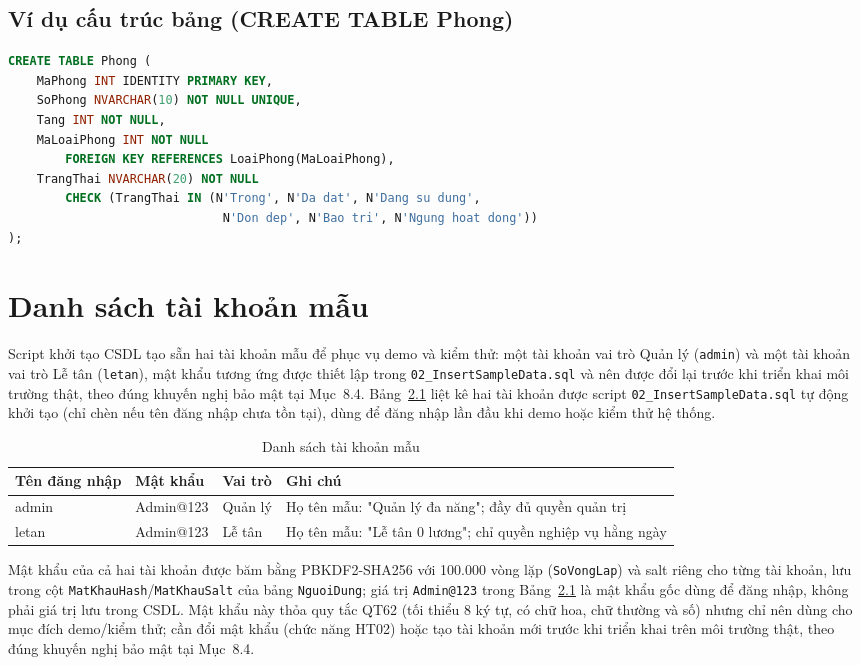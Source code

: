 \documentclass[14pt]{report}
\begin{document}
\section{Ví dụ cấu trúc bảng (CREATE TABLE Phong)}

\begin{lstlisting}[language=SQL, caption={Cấu trúc bảng Phong (rút gọn)}]
CREATE TABLE Phong (
    MaPhong INT IDENTITY PRIMARY KEY,
    SoPhong NVARCHAR(10) NOT NULL UNIQUE,
    Tang INT NOT NULL,
    MaLoaiPhong INT NOT NULL
        FOREIGN KEY REFERENCES LoaiPhong(MaLoaiPhong),
    TrangThai NVARCHAR(20) NOT NULL
        CHECK (TrangThai IN (N'Trong', N'Da dat', N'Dang su dung',
                              N'Don dep', N'Bao tri', N'Ngung hoat dong'))
);
\end{lstlisting}

\chapter{Danh sách tài khoản mẫu}

Script khởi tạo CSDL tạo sẵn hai tài khoản mẫu để phục vụ demo và kiểm thử: một tài khoản vai trò Quản lý (\texttt{admin}) và một tài khoản vai trò Lễ tân (\texttt{letan}), mật khẩu tương ứng được thiết lập trong \texttt{02\_InsertSampleData.sql} và nên được đổi lại trước khi triển khai môi trường thật, theo đúng khuyến nghị bảo mật tại Mục~8.4.
Bảng~\ref{tab:taikhoan-mau} liệt kê hai tài khoản được script \texttt{02\_InsertSampleData.sql} tự động khởi tạo (chỉ chèn nếu tên đăng nhập chưa tồn tại), dùng để đăng nhập lần đầu khi demo hoặc kiểm thử hệ thống.

\begin{table}[H]
\centering
\caption{Danh sách tài khoản mẫu}
\label{tab:taikhoan-mau}
\begin{tabularx}{\textwidth}{|l|l|l|X|}
\hline
\textbf{Tên đăng nhập} & \textbf{Mật khẩu} & \textbf{Vai trò} & \textbf{Ghi chú} \\\hline
admin & Admin@123 & Quản lý & Họ tên mẫu: "Quản lý đa năng"; đầy đủ quyền quản trị \\\hline
letan & Admin@123 & Lễ tân & Họ tên mẫu: "Lễ tân 0 lương"; chỉ quyền nghiệp vụ hằng ngày \\\hline
\end{tabularx}
\end{table}

Mật khẩu của cả hai tài khoản được băm bằng PBKDF2-SHA256 với 100.000 vòng lặp (\texttt{SoVongLap}) và salt riêng cho từng tài khoản, lưu trong cột \texttt{MatKhauHash}/\texttt{MatKhauSalt} của bảng \texttt{NguoiDung}; giá trị \texttt{Admin@123} trong Bảng~\ref{tab:taikhoan-mau} là mật khẩu gốc dùng để đăng nhập, không phải giá trị lưu trong CSDL. Mật khẩu này thỏa quy tắc QT62 (tối thiểu 8 ký tự, có chữ hoa, chữ thường và số) nhưng chỉ nên dùng cho mục đích demo/kiểm thử; cần đổi mật khẩu (chức năng HT02) hoặc tạo tài khoản mới trước khi triển khai trên môi trường thật, theo đúng khuyến nghị bảo mật tại Mục~8.4.

\end{document}
